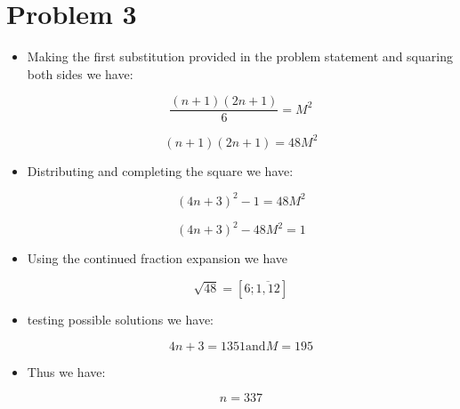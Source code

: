 \documentclass[]{report}
\begin{document}
\section{Problem 3}

\begin{itemize}
	\item Making the first substitution provided in the problem statement and squaring both sides we have:
	
	$$ \frac{(n + 1)(2n + 1)}{6} = M^2 $$
	
	
	$$ (n + 1)(2n + 1) = 48 M^2 $$
	
	
	\item Distributing and completing the square we have:
	
	
	$$ (4n + 3)^2 -  1 = 48 M^2 $$
	
	$$ (4n + 3)^2  - 48 M^2  = 1$$
	
	\item Using the continued fraction  expansion we have
	
	
		$$\sqrt{48} = [6; \overline{1, 12}]$$
		
	\item testing possible solutions we have:
	
	$$ 4 n + 3 = 1351 \text{and} M = 195$$
	
	\item Thus we have:
	
	$$ n = 337 $$
		
	
	
	
		 
\end{itemize}
\end{document}
